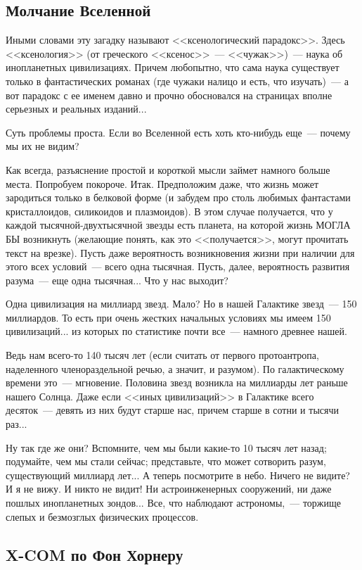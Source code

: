 \documentclass{scrbook}
\newcommand{\flqq}{<<}
\newcommand{\frqq}{>>}
\newcommand{\mdash}{~--- }
\newcommand{\commamdash}{~--- } %
\newcommand{\essaysection}[1]{\subsection*{#1}\nopagebreak}
\begin{document}
\essaysection{Молчание Вселенной}

Иными словами эту загадку называют {\flqq}ксенологический парадокс{\frqq}. Здесь {\flqq}ксенология{\frqq} (от греческого {\flqq}ксенос{\frqq}{\mdash}{\flqq}чужак{\frqq}){\mdash}наука об инопланетных цивилизациях. Причем любопытно, что сама наука существует только в фантастических романах (где чужаки налицо и есть, что изучать){\mdash}а вот парадокс с ее именем давно и прочно обосновался на страницах вполне серьезных и реальных изданий...

Суть проблемы проста. Если во Вселенной есть хоть кто-нибудь еще{\mdash}почему мы их не видим?

Как всегда, разъяснение простой и короткой мысли займет намного больше места. Попробуем покороче. Итак. Предположим даже, что жизнь может зародиться только в белковой форме (и забудем про столь любимых фантастами кристаллоидов, силикоидов и плазмоидов). В этом случае получается, что у каждой тысячной-двухтысячной звезды есть планета, на которой жизнь МОГЛА БЫ возникнуть (желающие понять, как это {\flqq}получается{\frqq}, могут прочитать текст на врезке). Пусть даже вероятность возникновения жизни при наличии для этого всех условий{\mdash}всего одна тысячная. Пусть, далее, вероятность развития разума{\mdash}еще одна тысячная... Что у нас выходит?

Одна цивилизация на миллиард звезд. Мало? Но в нашей Галактике звезд{\mdash}150 миллиардов. То есть при очень жестких начальных условиях мы имеем 150 цивилизаций... из которых по статистике почти все{\mdash}намного древнее нашей.

Ведь нам всего-то 140 тысяч лет (если считать от первого протоантропа, наделенного членораздельной речью, а значит, и разумом). По галактическому времени это{\mdash}мгновение. Половина звезд возникла на миллиарды лет раньше нашего Солнца. Даже если {\flqq}иных цивилизаций{\frqq} в Галактике всего десяток{\mdash}девять из них будут старше нас, причем старше в сотни и тысячи раз...

Ну так где же они? Вспомните, чем мы были какие-то 10 тысяч лет назад; подумайте, чем мы стали сейчас; представьте, что может сотворить разум, существующий миллиард лет... А теперь посмотрите в небо. Ничего не видите? И я не вижу. И никто не видит! Ни астроинженерных сооружений, ни даже пошлых инопланетных зондов... Все, что наблюдают астрономы,{\commamdash}торжище слепых и безмозглых физических процессов.

\essaysection{X-COM по Фон Хорнеру}
\end{document}

